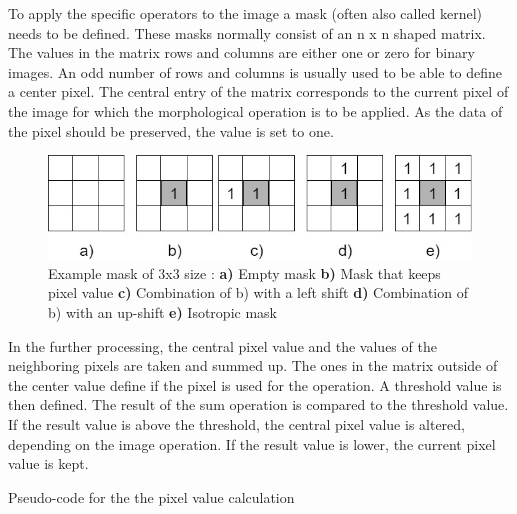To apply the specific operators to the image a mask (often also called kernel) needs to be defined. These masks normally consist of an n x n shaped matrix. The values in the matrix rows and columns are either one or zero for binary images. An odd number of rows and columns is usually used to be able to define a center pixel. The central entry of the matrix corresponds to the current pixel of the image for which the morphological operation is to be applied. As the data of the pixel should be preserved, the value is set to one. 
\begin{figure}[H]
\includegraphics[width=\textwidth]{images/morpological_kernels.jpg}
\caption{ Example mask of 3x3 size : \textbf{a)} Empty mask \textbf{b)} Mask that keeps pixel value  \textbf{c)} Combination of b) with a left shift   \textbf{d)} Combination of b) with an up-shift   \textbf{e)} Isotropic mask}
\label{morphological_ops} 
\end{figure}
In the further processing, the central pixel value and the values of the neighboring pixels are taken and summed up. The ones in the matrix outside of the center value define if the pixel is used for the operation. A threshold value is then defined. The result of the sum operation is compared to the threshold value. If the result value is above the threshold, the central pixel value is altered, depending on the image operation. If the  result value is lower, the current pixel value is kept.
\begin{algorithm}
\SetAlgoLined
{}
\BlankLine
{}
\BlankLine
{}
\If{\Result $>=$ \Threshold}{\CentVal$=$ \OpVal}
\caption{Pseudo-code for the the pixel value calculation}
\label{mask_calc_pseudocode}
\end{algorithm}
